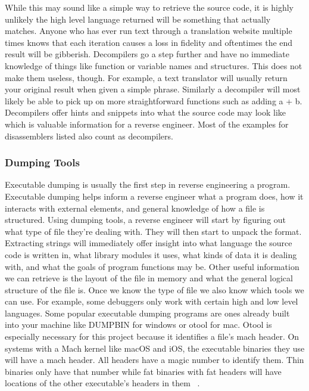 \documentclass[12pt]{article}
\begin{document}
While this may sound like a simple way to retrieve the source code, it is highly unlikely the high level language returned will be something that actually matches. Anyone who has ever run text through a translation website multiple times knows that each iteration causes a loss in fidelity and oftentimes the end result will be gibberish. Decompilers go a step further and have no immediate knowledge of things like function or variable names and structures. This does not make them useless, though. For example, a text translator will usually return your original result when given a simple phrase. Similarly a decompiler will most likely be able to pick up on more straightforward functions such as adding a + b. Decompilers offer hints and snippets into what the source code may look like which is valuable information for a reverse engineer. Most of the examples for disassemblers listed also count as decompilers.


\subsubsection{Dumping Tools}
Executable dumping is usually the first step in reverse engineering a program. Executable dumping helps inform a reverse engineer what a program does, how it interacts with external elements, and general knowledge of how a file is structured. Using dumping tools, a reverse engineer will start by figuring out what type of file they’re dealing with. They will then start to unpack the format. Extracting strings will immediately offer insight into what language the source code is written in, what library modules it uses, what kinds of data it is dealing with, and what the goals of program functions may be. Other useful information we can retrieve is the layout of the file in memory and what the general logical structure of the file is. Once we know the type of file we also know which tools we can use. For example, some debuggers only work with certain high and low level languages. Some popular executable dumping programs are ones already built into your machine like DUMPBIN for windows or otool for mac. 
Otool is especially necessary for this project because it identifies a file's mach header. On systems with a Mach kernel like macOS and iOS, the executable binaries they use will have a mach header. All headers have a magic number to identify them. Thin binaries only have that number while fat binaries with fat headers will have locations of the other executable's headers in them ~\cite{mobileRe}.
\end{document}
